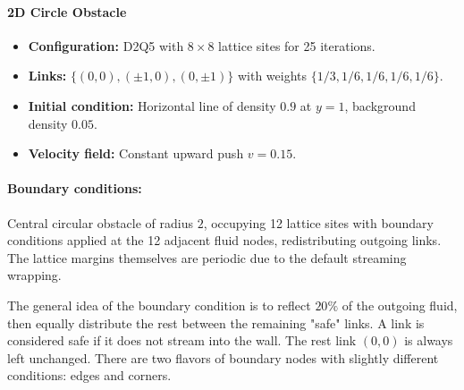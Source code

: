 \paragraph*{2D Circle Obstacle}
\begin{itemize}
    \item \textbf{Configuration:} D2Q5 with $8 \times 8$ lattice sites for 25 iterations.
    \item \textbf{Links:} $\{(0,0),(\pm1,0),(0,\pm1)\}$ with weights $\{1/3, 1/6, 1/6, 1/6, 1/6\}$.
    \item \textbf{Initial condition:} Horizontal line of density $0.9$ at $y=1$, background density $0.05$.
    \item \textbf{Velocity field:} Constant upward push $v=0.15$.
\end{itemize}
\paragraph*{Boundary conditions:}
Central circular obstacle of radius $2$, occupying 12 lattice sites with boundary conditions applied at the 12 adjacent fluid nodes, redistributing outgoing links. The lattice margins themselves are periodic due to the default streaming wrapping.

The general idea of the boundary condition is to reflect $20\%$ of the outgoing fluid, then equally distribute the rest between the remaining "safe" links.
A link is considered safe if it does not stream into the wall. The rest link $(0,0)$ is always left unchanged.
There are two flavors of boundary nodes with slightly different conditions: edges and corners.

